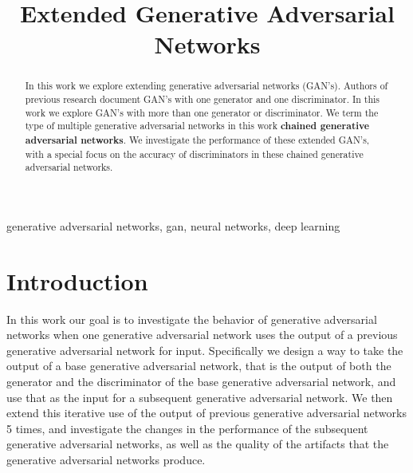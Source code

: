 \documentclass[conference]{IEEEtran}
\begin{document}
\title{Extended Generative Adversarial Networks}

\author{
}


\maketitle

\begin{abstract}
In this work we explore extending generative adversarial networks (GAN's).
Authors of previous research document GAN's with one generator and one
discriminator. In this work we explore GAN's with more than one generator or
discriminator.  We term the type of multiple generative adversarial networks in
this work \textbf{chained generative adversarial networks}.  We investigate the
performance of these extended GAN's, with a special focus on the accuracy of
discriminators in these chained generative adversarial networks.
\end{abstract}

\begin{IEEEkeywords}
generative adversarial networks, gan, neural networks, deep learning
\end{IEEEkeywords}

\section{Introduction}

In this work our goal is to investigate the behavior of generative adversarial
networks when one generative adversarial network uses the output of a previous
generative adversarial network for input.  Specifically we design a way to take
the output of a base generative adversarial network, that is the output of both
the generator and the discriminator of the base generative adversarial network,
and use that as the input for a subsequent generative adversarial network.  We
then extend this iterative use of the output of previous generative adversarial
networks 5 times, and investigate the changes in the performance of the
subsequent generative adversarial networks, as well as the quality of the
artifacts that the generative adversarial networks produce.
\end{document}
